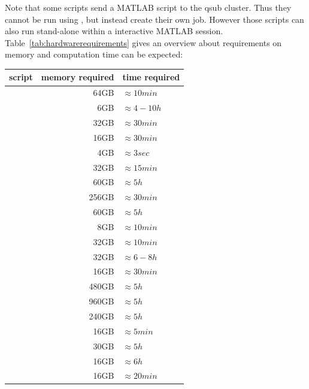 \documentclass[12pt,a4paper]{scrartcl}
\begin{document}
\noindent Note that some scripts send a MATLAB script to the qsub cluster. Thus they cannot be run using \texttt{}, but instead create their own job. However those scripts can also run stand-alone within a interactive MATLAB session.\\

\noindent Table~\ref{tab:hardwarerequirements} gives an overview about requirements on memory and computation time can be expected:

\begin{table}[h]
\centering
\begin{tabular}{l | r | l}
\toprule
script & memory required & time required\\\hline
  \nameref{sh:combsplt} & 64GB & $\approx 10min$ \\\hline
  \nameref{sh:analyzePRF} & 6GB & $\approx 4-10h$ \\\hline
  \nameref{sh:applydistcorr} & 32GB & $\approx 30min$ \\\hline
  \nameref{sh:coreg} & 16GB & $\approx 30min$ \\\hline
  \nameref{sh:corravg} & 4GB & $\approx 3sec$ \\\hline
  \nameref{sh:distcorr} & 32GB & $\approx 15min$ \\\hline
  \nameref{sh:beamf} & 60GB & $\approx 5h$ \\\hline
  \nameref{sh:selchan} & 256GB & $\approx 30min$ \\\hline
  \nameref{sh:freqVirt} & 60GB & $\approx 5h$ \\\hline
  \nameref{sh:prepFS4EEG} & 8GB & $\approx 10min$ \\\hline
  \nameref{sh:prepHM} & 32GB & $\approx 10min$ \\\hline
  \nameref{sh:prepSM} & 32GB & $\approx 6-8h$ \\\hline
  \nameref{sh:EEGpreproc} & 16GB & $\approx 30min$ \\\hline
  \nameref{sh:splitbeamf} & 480GB & $\approx 5h$ \\\hline
  \nameref{sh:splitfreqVirt} & 960GB & $\approx 5h$ \\\hline
  \nameref{sh:splitvirtch} & 240GB & $\approx 5h$ \\\hline
  \nameref{sh:timelock} & 16GB & $\approx 5min$ \\\hline
  \nameref{sh:virtch} & 30GB & $\approx 5h$ \\\hline
  \nameref{sh:fsrecon} & 16GB & $\approx 6h$ \\\hline
  \nameref{sh:getLyr} & 16GB & $\approx 20min$ \\\hline

\end{tabular}
\end{table}
\end{document}
